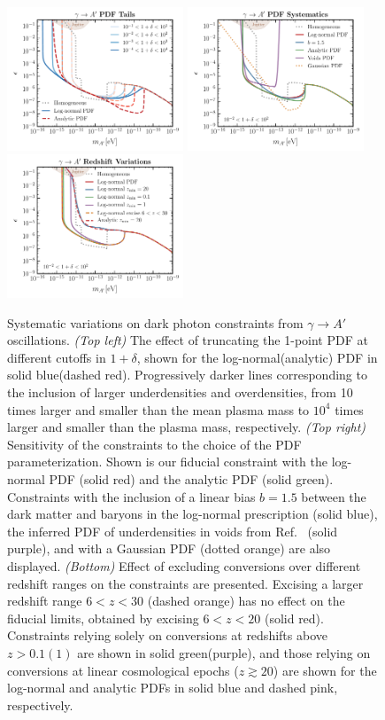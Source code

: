 \documentclass[prd,aps,10pt,nofootinbib,twocolumn,superscriptaddress,preprintnumbers,balancelastpage,longbibliography]{revtex4-1}
\begin{document}
%
\begin{figure}[tbp]
    \centering
    \includegraphics[width=0.47\textwidth]{plots/limit_dp_pdf_tails}
    \includegraphics[width=0.47\textwidth]{plots/limit_dp_pdfs}
    \includegraphics[width=0.47\textwidth]{plots/limit_dp_redshifts}
    \caption{Systematic variations on dark photon constraints from $\gamma\to A'$ oscillations. \emph{(Top left)} The effect of truncating the 1-point PDF at different cutoffs in $1 + \delta$, shown for the log-normal(analytic) PDF in solid blue(dashed red). Progressively darker lines corresponding to the inclusion of larger underdensities and overdensities, from 10 times larger and smaller than the mean plasma mass to $10^4$ times larger and smaller than the plasma mass, respectively. \emph{(Top right)} Sensitivity of the constraints to the choice of the PDF parameterization. Shown is our fiducial constraint with the log-normal PDF (solid red) and the analytic PDF (solid green). Constraints with the inclusion of a linear bias $b=1.5$ between the dark matter and baryons in the log-normal prescription (solid blue), the inferred PDF of underdensities in voids from Ref.~\cite{Adermann:2018jba} (solid purple), and with a Gaussian PDF (dotted orange) are also displayed. \emph{(Bottom)} Effect of excluding conversions over different redshift ranges on the constraints are presented. Excising a larger redshift range $6 < z < 30$ (dashed orange) has no effect on the fiducial limits, obtained by excising $6 < z < 20$ (solid red). Constraints relying solely on conversions at redshifts above $z > 0.1(1)$ are shown in solid green(purple), and those relying on conversions at linear cosmological epochs ($z \gtrsim 20$) are shown for the log-normal and analytic PDFs in solid blue and dashed pink, respectively. } 

\end{figure}
\end{document}
